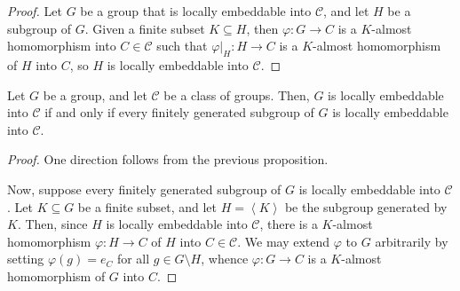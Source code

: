 \documentclass[10pt]{mypackage}
\begin{document}
\begin{proof}
  Let $G$ be a group that is locally embeddable into $\mathcal{C}$, and let $H$ be a subgroup of $G$. Given a finite subset $K\subseteq H$, then $\varphi\colon G\rightarrow C$ is a $K$-almost homomorphism into $C\in \mathcal{C}$ such that $\varphi|_{H}\colon H\rightarrow C$ is a $K$-almost homomorphism of $H$ into $C$, so $H$ is locally embeddable into $\mathcal{C}$.
\end{proof}
\begin{proposition}
  Let $G$ be a group, and let $\mathcal{C}$ be a class of groups. Then, $G$ is locally embeddable into $\mathcal{C}$ if and only if every finitely generated subgroup of $G$ is locally embeddable into $\mathcal{C}$.
\end{proposition}
\begin{proof}
  One direction follows from the previous proposition.

  Now, suppose every finitely generated subgroup of $G$ is locally embeddable into $\mathcal{C}$. Let $K\subseteq G$ be a finite subset, and let $H = \left\langle K \right\rangle$ be the subgroup generated by $K$. Then, since $H$ is locally embeddable into $\mathcal{C}$, there is a $K$-almost homomorphism $\varphi\colon H\rightarrow C$ of $H$ into $C\in \mathcal{C}$. We may extend $\varphi$ to $G$ arbitrarily by setting $\varphi(g) = e_C$ for all $g\in G\setminus H$, whence $\varphi\colon G\rightarrow C$ is a $K$-almost homomorphism of $G$ into $C$.
\end{proof}
\end{document}
